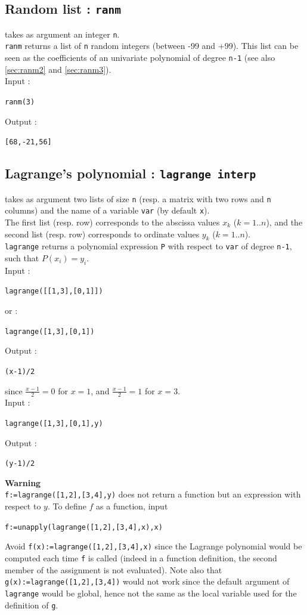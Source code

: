 \documentclass[a4paper,11pt]{book}
\begin{document}
\subsection{Random list : {\tt ranm}}\label{sec:ranm1}
 takes as argument an integer {\tt n}.\\
{\tt ranm} returns a list of {\tt n} random integers (between -99 and  +99).
This list can be seen as the coefficients of an univariate 
polynomial of degree {\tt n-1}
(see also \ref{sec:ranm2} and  \ref{sec:ranm3}).\\
Input :
\begin{center}{\tt ranm(3)}\end{center}
Output :
\begin{center}{\tt [68,-21,56]}\end{center}

\subsection{Lagrange's polynomial  : {\tt lagrange interp}}
 takes as argument two lists of size {\tt n} (resp. a 
matrix with two rows and  {\tt n} columns) and the name of a  variable 
{\tt var} (by default {\tt x}).\\
The first list (resp. row) corresponds to the abscissa values $x_k$ ($k=1..n$), 
and the second list (resp. row) corresponds to ordinate values $y_k$ 
($k=1..n$).\\
{\tt lagrange} returns a polynomial expression {\tt P} 
with respect to {\tt var} of degree 
{\tt n-1}, such that $P(x_i)=y_i$.\\
Input :
\begin{center}{\tt lagrange([[1,3],[0,1]])}\end{center}
or :
\begin{center}{\tt lagrange([1,3],[0,1])}\end{center}
Output :
\begin{center}{\tt (x-1)/2}\end{center}
since $\frac{x-1}{2}=0$ for $x=1$,  and  $\frac{x-1}{2}=1$ for $x=3$.\\ 
Input :
\begin{center}{\tt lagrange([1,3],[0,1],y)}\end{center}
Output :
\begin{center}{\tt (y-1)/2}\end{center}
{\bf Warning}\\
{\tt f:=lagrange([1,2],[3,4],y)} does not return a function 
but an expression with respect to $y$.
To define $f$ as a function, input
\begin{center}
{\tt f:=unapply(lagrange([1,2],[3,4],x),x)}
\end{center}
Avoid {\tt f(x):=lagrange([1,2],[3,4],x)} since
the Lagrange polynomial would be computed each time {\tt f} is called
(indeed in a function definition, the second member of the assignment
is not evaluated).
Note also that \\
{\tt g(x):=lagrange([1,2],[3,4])} would not work
since the default argument of {\tt lagrange}
would be global, hence not the same as the local
variable used for the definition of {\tt g}.
\end{document}
